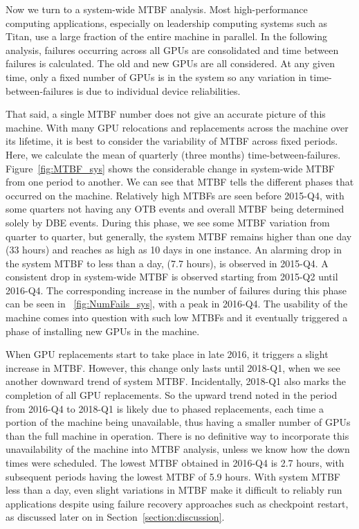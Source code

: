 Now we turn to a system-wide MTBF analysis. Most high-performance
computing applications, especially on leadership computing
systems such as Titan, use a large fraction of the entire machine in parallel.  
In the following analysis, failures occurring across all GPUs are consolidated and time between failures
is calculated. The old and new GPUs are all considered. At any given time, only a fixed number of GPUs
is in the system so any variation in time-between-failures is due to individual device reliabilities.

That said, a single MTBF number does not give an accurate picture of this machine.
With many GPU relocations and replacements across the machine over its lifetime, it is 
best to consider the variability of MTBF across fixed periods. Here, we calculate 
the mean of quarterly (three months) time-between-failures. Figure~\ref{fig:MTBF_sys}
shows the considerable change in system-wide MTBF from one period to another. 
We can see that MTBF tells the different phases that occurred on the machine. 
Relatively high MTBFs are seen before 2015-Q4, with some quarters not having any OTB events 
and overall MTBF being determined solely by DBE events. During this
phase, we see some MTBF variation from quarter to quarter, but
generally, the system MTBF remains higher than one day (33 hours) and reaches as high
as 10 days in one instance. An alarming drop in the system MTBF to less than a day, (7.7 hours), is observed in 2015-Q4.
A consistent drop in system-wide MTBF is observed starting from 2015-Q2 until 2016-Q4. 
The corresponding increase in the number of failures during this phase can be seen in ~\ref{fig:NumFails_sys},
with a peak in 2016-Q4. The usability of the machine comes into
question with such low MTBFs and it eventually triggered 
a phase of installing new GPUs in the machine.

When GPU replacements start to take place in late 
2016, it triggers a slight increase in MTBF. However, this change only lasts until 2018-Q1, when we see another 
downward trend of system MTBF. Incidentally, 2018-Q1 also marks the completion of all GPU replacements. 
So the upward trend noted in the period from 2016-Q4 to 2018-Q1 is
likely due to phased replacements, each time a portion of the machine 
being unavailable, thus having a smaller number of GPUs than the full
machine in operation. 
There is no definitive way to incorporate this unavailability of the
machine into MTBF analysis, unless we know how the down times were scheduled.
The lowest MTBF obtained in 2016-Q4 is 2.7 hours, with subsequent periods having the 
lowest MTBF of 5.9 hours. With system MTBF less than a day, even slight variations in MTBF make it 
difficult to reliably run applications despite using failure recovery approaches such as checkpoint restart, 
as discussed later on in Section~\ref{section:discussion}. 

